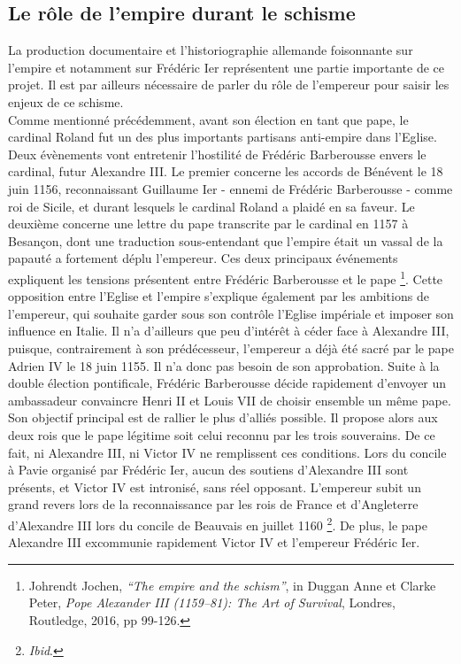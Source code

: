     \subsection{Le rôle de l'empire durant le schisme}

La production documentaire et l’historiographie allemande foisonnante sur l’empire et notamment sur Frédéric Ier représentent une partie importante de ce projet. Il est par ailleurs nécessaire de parler du rôle de l’empereur pour saisir les enjeux de ce schisme.\\
Comme mentionné précédemment, avant son élection en tant que pape, le cardinal Roland fut un des plus importants partisans anti-empire dans l’Eglise. Deux évènements vont entretenir l’hostilité de Frédéric Barberousse envers le cardinal, futur Alexandre III. Le premier concerne les accords de Bénévent le 18 juin 1156, reconnaissant Guillaume Ier - ennemi de Frédéric Barberousse - comme roi de Sicile, et durant lesquels le cardinal Roland a plaidé en sa faveur. Le deuxième concerne une lettre du pape transcrite par le cardinal en 1157 à Besançon, dont une traduction sous-entendant que l’empire était un vassal de la papauté a fortement déplu l’empereur. Ces deux principaux événements expliquent les tensions présentent entre Frédéric Barberousse et le pape \footnote{Johrendt Jochen, \textit{“The empire and the schism”}, in Duggan Anne et Clarke Peter, \textit{Pope Alexander III (1159–81): The Art of Survival}, Londres, Routledge, 2016, pp 99-126.}. Cette opposition entre l’Eglise et l’empire s’explique également par les ambitions de l’empereur, qui souhaite garder sous son contrôle l’Eglise impériale et imposer son influence en Italie. Il n’a d’ailleurs que peu d’intérêt à céder face à Alexandre III, puisque, contrairement à son prédécesseur, l’empereur a déjà été sacré par le pape Adrien IV le 18 juin 1155. Il n’a donc pas besoin de son approbation.
Suite à la double élection pontificale, Frédéric Barberousse décide rapidement d'envoyer un ambassadeur convaincre Henri II et Louis VII de choisir ensemble un même pape. Son objectif principal est de rallier le plus d’alliés possible. Il propose alors aux deux rois que le pape légitime soit celui reconnu par les trois souverains. De ce fait, ni Alexandre III, ni Victor IV ne remplissent ces conditions. Lors du concile à Pavie organisé par Frédéric Ier, aucun des soutiens d’Alexandre III sont présents, et Victor IV est intronisé, sans réel opposant. L’empereur subit un grand revers lors de la reconnaissance par les rois de France et d’Angleterre d’Alexandre III lors du concile de Beauvais en juillet 1160 \footnote{\textit{Ibid}.}. De plus, le pape Alexandre III excommunie rapidement Victor IV et l’empereur Frédéric Ier.\\
